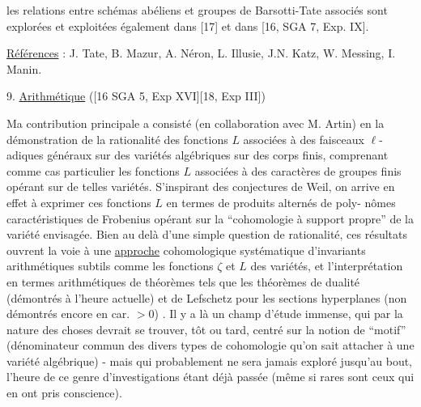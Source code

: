
les relations entre schémas abéliens et groupes de
Barsotti-Tate associés sont explorées et exploitées
également dans [17] et dans [16, SGA 7, Exp. IX].

\uline{Références} : J. Tate, B. Mazur, A. Néron, L. Illusie,
J.N. Katz, W. Messing, I. Manin.

9. \uline{Arithmétique} ([16 SGA 5, Exp XVI][18, Exp III])

Ma contribution principale a consisté (en
collaboration avec M. Artin) en la démonstration de
la rationalité des fonctions $L$ associées à des
faisceaux $\ell$-adiques généraux sur des variétés algébriques
sur des corps finis, comprenant comme cas particulier
les fonctions $L$ associées à des caractères de groupes
finis opérant sur de telles variétés. S'inspirant des
conjectures de Weil, on arrive en effet à exprimer ces
fonctions $L$ en termes de produits alternés de poly-%
nômes caractéristiques de Frobenius opérant sur la
``cohomologie à support propre'' de la variété envisagée.
Bien au delà d'une simple question de rationalité, ces
résultats ouvrent la voie à une \uline{approche} cohomologique
systématique d'invariants arithmétiques subtils comme
les fonctions $\zeta$ et $L$ des variétés, et l'interprétation
en termes arithmétiques de théorèmes tels que les
théorèmes de dualité (démontrés à l'heure actuelle) et
de Lefschetz pour les sections hyperplanes (non démontrés
encore en car. $> 0$) . Il y a là un champ d'étude immense,
qui par la nature des choses devrait se trouver, tôt
ou tard, centré sur la notion de ``motif'' (dénominateur
commun des divers types de cohomologie qu'on sait attacher
à une variété algébrique) - mais qui probablement ne
sera jamais exploré jusqu'au bout, l'heure de ce genre
d'investigations étant déjà passée (même si rares sont
ceux qui en ont pris conscience).

